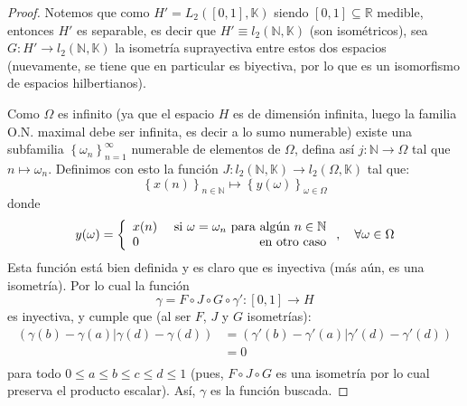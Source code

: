 \documentclass[12pt]{report}
\theoremstyle{largebreak}
\newcommand\cf[3]{\ensuremath{#1:#2\rightarrow#3}}
\newcommand\pint[2]{\ensuremath{\left(#1\big|#2\right)}}
\begin{document}
\begin{proof}
        Notemos que como $H'=L_2([0,1],\mathbb{K})$ siendo $[0,1]\subseteq\mathbb{R}$ medible, entonces $H'$ es separable, es decir que $H'\equiv l_2(\mathbb{N},\mathbb{K})$ (son isométricos), sea $\cf{G}{H'}{l_2(\mathbb{N},\mathbb{K})}$ la isometría suprayectiva entre estos dos espacios (nuevamente, se tiene que en particular es biyectiva, por lo que es un isomorfismo de espacios hilbertianos).

        Como $\Omega$ es infinito (ya que el espacio $H$ es de dimensión infinita, luego la familia O.N. maximal debe ser infinita, es decir a lo sumo numerable) existe una subfamilia $\left\{\omega_n \right\}_{n=1}^\infty$ numerable de elementos de $\Omega$, defina así $\cf{j}{\mathbb{N}}{\Omega}$ tal que $n\mapsto \omega_n$. Definimos con esto la función $\cf{J}{l_2(\mathbb{N},\mathbb{K})}{l_2(\Omega,\mathbb{K})}$ tal que:
        \begin{equation*}
            \left\{x(n) \right\}_{n\in\mathbb{N}}\mapsto\left\{y(\omega) \right\}_{\omega\in\Omega}
        \end{equation*}
        donde
        \begin{equation*}
            y(\omega)=\left\{
                \begin{array}{lr}
                    x(n) & \textup{ si }\omega=\omega_n\textup{ para algún }n\in\mathbb{N}\\
                    0 & \textup{ en otro caso} \\
                \end{array}
            \right.
            ,\quad\forall\omega\in\Omega
        \end{equation*}
        Esta función está bien definida y es claro que es inyectiva (más aún, es una isometría). Por lo cual la función
        \begin{equation*}
            \gamma=F\circ J\circ G\circ \gamma':[0,1]\rightarrow H
        \end{equation*}
        es inyectiva, y cumple que (al ser $F$, $J$ y $G$ isometrías):
        \begin{equation*}
            \begin{split}
                \pint{\gamma(b)-\gamma(a)}{\gamma(d)-\gamma(d)}&=\pint{\gamma'(b)-\gamma'(a)}{\gamma'(d)-\gamma'(d)}\\
                &=0\\
            \end{split}
        \end{equation*}
        para todo $0\leq a\leq b\leq c\leq d\leq 1$ (pues, $F\circ J\circ G$ es una isometría por lo cual preserva el producto escalar). Así, $\gamma$ es la función buscada.
    \end{proof}
\end{document}

